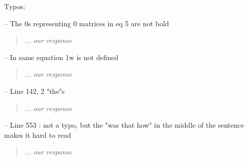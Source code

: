 \documentclass[11pt]{article}
\begin{document}
\noindent Typos:
\smallskip

\noindent-- The 0s representing 0 matrices in eq 5 are not bold
\begin{quote}
	{\itshape ... our response}
\end{quote}

\noindent-- In same equation 1w is not defined
\begin{quote}
	{\itshape ... our response}
\end{quote}

\noindent-- Line 142, 2 "the"s
\begin{quote}
	{\itshape ... our response}
\end{quote}

\noindent-- Line 553 : not a typo, but the "was that how" in the middle of the sentence makes it hard to read
\begin{quote}
	{\itshape ... our response}
\end{quote}
\end{document}
